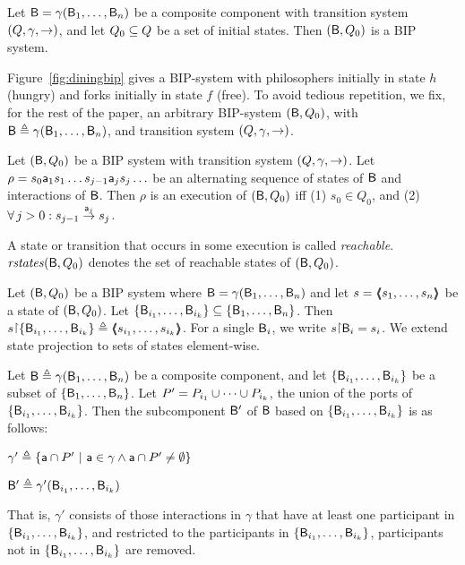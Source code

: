 \begin{definition}\label{def.bip.system} Let $\B = \gamma(\B_1,\dots,\B_n)$ be a composite component with transition system $(Q,\gamma,
\goestog)$, and let $Q_0 \sub Q$ be a set of initial states. Then
$(\B,Q_0)$ is a BIP system.  
\end{definition}

\noindent
Figure~\ref{fig:diningbip} gives a BIP-system with philosophers initially in state $h$ (hungry) and forks initially in
state $f$ (free).
%
To avoid tedious repetition, we fix, for the rest of the paper, an arbitrary BIP-system $(\B, Q_0)$, with
$\B \df \gamma(\B_1,\dots,\B_n)$, and transition system $(Q,\gamma, \goestog)$.

\begin{definition}[Execution]\label{def.bip.execution} Let $(\B, Q_0)$ be a BIP system
with transition system $(Q,\gamma, \goestog)$.  Let $\rho = s_0 \act_1 s_1 \ldots s_{j-1} \act_j s_j \ldots$ be an alternating sequence of
states of $\B$ and interactions of $\B$. Then $\rho$ is an execution of
$(\B, Q_0)$ iff (1) $s_0 \in Q_0$, and (2) $\fa j > 0: s_{j-1} \goesto[\act_j] s_j$. 
\end{definition}

\begin{definition}\label{def.bip.reachable}
A state or transition that occurs in some execution is called \emph{reachable}.
$\rstates{\B,Q_0}$ denotes the set of reachable states of $(\B, Q_0)$.
\end{definition}


\begin{definition}\label{def.bip.state.projection} Let $(\B, Q_0)$ be a BIP system where $\B = \gamma(\B_1,\dots,\B_n)$ and let
$s = \tpl{s_1,\dots,s_n}$ be a state of $(\B, Q_0)$. Let $\set{\B_{i_1},\dots,\B_{i_k}} \sub \set{\B_1,\dots,\B_n}$. Then
$s \pj \set{\B_{i_1},\dots,\B_{i_k}} \df \tpl{s_{i_1},\dots,s_{i_k}}$. For a single $\B_i$, we write $s \pj \B_i = s_i$.
%
We extend state projection to sets of states element-wise.
\end{definition}

\begin{definition}[Subcomponent]\label{def.bip.subcomponent} Let $\B \df \gamma(\B_1,\dots,\B_n)$ be a composite component, and let $\set{\B_{i_1},\dots,\B_{i_k}}$
be a subset of $\set{\B_{1},\dots,\B_{n}}$.  Let $P' = P_{i_1} \un \cdots \un P_{i_k}$, \ie the union of the ports of $\set{\B_{i_1},\dots,\B_{i_k}}$.
Then the subcomponent $\B'$ of $\B$ based on $\set{\B_{i_1},\dots,\B_{i_k}}$ is as follows:
%
\bn
\item $\gamma' \df \set{ \act \ints P' \st \act \in \gamma \land \act \ints P' \ne \emptyset}$
\item $\B' \df \gamma'(\B_{i_1},\dots,\B_{i_k})$ 
\en
\end{definition}
%
That is, $\gamma'$ consists of those interactions in $\gamma$ that have at least one participant in 
$\set{\B_{i_1},\dots,\B_{i_k}}$, and restricted to the participants in $\set{\B_{i_1},\dots,\B_{i_k}}$,
\ie participants not in $\set{\B_{i_1},\dots,\B_{i_k}}$ are removed.

